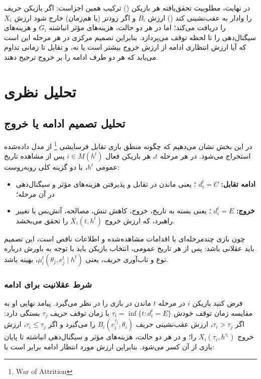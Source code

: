 \documentclass[12pt]{article}
\begin{document}
در نهایت، مطلوبیت تحقق‌یافته هر بازیکن () ترکیب همین اجزاست:
اگر بازیکن حریف را وادار به عقب‌نشینی کند () ارزش
$B_i$
و اگر زودتر (یا هم‌زمان) خارج شود ارزش
$X_i$
را دریافت می‌کند؛ اما در هر دو حالت، هزینه‌های مؤثر انباشته
$G_i$
و هزینه‌های سیگنال‌دهی را تا لحظه توقف می‌پردازد.
بنابراین تصمیم مرکزی در هر مرحله این است که آیا ارزش انتظاری ادامه از ارزش خروج بیشتر است یا نه،
و تقابل تا زمانی تداوم می‌یابد که هر دو طرف ادامه را بر خروج ترجیح دهند.

\section{تحلیل نظری}

\subsection{تحلیل تصمیم ادامه یا خروج}

در این بخش نشان می‌دهیم که چگونه منطق بازی تقابل فرسایشی \footnote{War of Attrition}
از مدل داده‌شده استخراج می‌شود.
در هر مرحله $t$،
 هر بازیکن فعال 
 $i \in M(h^t)$
  پس از مشاهده تاریخ عمومی 
  $h^t$،
با دو گزینه کلی روبه‌روست:

\begin{itemize}
    \item {
        \textbf{ادامه تقابل:} 
        $d_i^t = C$
        ؛ یعنی ماندن در تقابل و
         پذیرفتن 
        هزینه‌های مؤثر و سیگنال‌دهی در آن مرحله؛
    }
    \item {
        \textbf{خروج:} 
        $d_i^t = E$
        ؛ یعنی بسته به تاریخ، خروج، کاهش تنش، مصالحه، آتش‌بس یا تغییر راهبرد،
        که ارزش خروج  $X_i(t,h^t)$ را تحقق می‌بخشد.
    }
\end{itemize}

چون بازی چندمرحله‌ای با اقدامات مشاهده‌شده و اطلاعات ناقص است، این تصمیم باید
عقلانی
 باشد: پس از هر تاریخ عمومی، انتخاب بازیکن باید با توجه به باورش درباره
نوع و تاب‌آوری حریف، یعنی 
$\mu_i^t(\theta_j, e_j^t \mid h^t)$،
 بهینه باشد.

\subsubsection*{شرط عقلانیت برای ادامه}

فرض کنید بازیکن $i$ در مرحله $t$ 
ماندن در بازی را در نظر می‌گیرد. پیامد نهایی او به مقایسه
زمان توقف خودش 
$\tau_i = \inf\{t : d_i^t = E\}$
 با زمان توقف حریف 
 $\tau_j$ 
 بستگی دارد:
اگر $\tau_i > \tau_j$،
 ارزش عقب‌نشینی حریف 
 $B_i(e_i^{\tau_j}, \theta_i)$
  را می‌گیرد
و اگر 
$\tau_i \le \tau_j$، 
ارزش خروج 
$X_i(\tau_i, h^{\tau_i})$
 را؛ و در هر دو حالت،
هزینه‌های مؤثر و سیگنال‌دهی انباشته تا پایان بازی از آن کسر می‌شود.
بنابراین ارزش مورد انتظار ادامه برابر است با:
\end{document}
